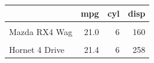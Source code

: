 \documentclass{article}
\begin{document}
\thispagestyle{empty}

\begin{table}
\centering
\begin{tabular}{lrrr}
\toprule
\textbf{ } & \textbf{mpg} & \textbf{cyl} & \textbf{disp}\\
\midrule
\cellcolor{nejmshade}{Mazda RX4} & \cellcolor{nejmshade}{21.0} & \cellcolor{nejmshade}{6} & \cellcolor{nejmshade}{160}\\
Mazda RX4 Wag & 21.0 & 6 & 160\\
\cellcolor{nejmshade}{Datsun 710} & \cellcolor{nejmshade}{22.8} & \cellcolor{nejmshade}{4} & \cellcolor{nejmshade}{108}\\
Hornet 4 Drive & 21.4 & 6 & 258\\
\bottomrule
\end{tabular}
\end{table}
\end{document}

